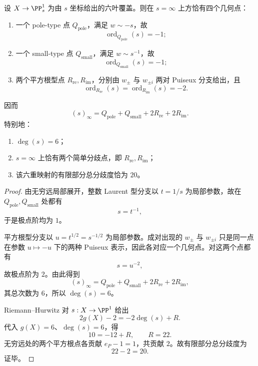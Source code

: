 \begin{theorem}\label{thm:conclusion-sprojection-infinity-pole-splitting-ramification20}
设 \(X\to \PP^1_s\) 为由 \(s\) 坐标给出的六叶覆盖。则在 \(s=\infty\) 上方恰有四个几何点：
\begin{enumerate}
  \item 一个 pole-type 点 \(Q_{\mathrm{pole}}\)，满足 \(w\sim -s\)，故
  \[
  \operatorname{ord}_{Q_{\mathrm{pole}}}(s)=-1;
  \]
  \item 一个 small-type 点 \(Q_{\mathrm{small}}\)，满足 \(w\sim s^{-1}\)，故
  \[
  \operatorname{ord}_{Q_{\mathrm{small}}}(s)=-1;
  \]
  \item 两个平方根型点 \(R_{\mathrm{re}},R_{\mathrm{im}}\)，分别由 \(w_\pm\) 与 \(w_{\pm i}\) 两对 Puiseux 分支给出，且
  \[
  \operatorname{ord}_{R_{\mathrm{re}}}(s)=\operatorname{ord}_{R_{\mathrm{im}}}(s)=-2.
  \]
\end{enumerate}
因而
\[
(s)_\infty=Q_{\mathrm{pole}}+Q_{\mathrm{small}}+2R_{\mathrm{re}}+2R_{\mathrm{im}}.
\]
特别地：
\begin{enumerate}
  \item \(\deg(s)=6\)；
  \item \(s=\infty\) 上恰有两个简单分歧点，即 \(R_{\mathrm{re}},R_{\mathrm{im}}\)；
  \item 该六重映射的有限部分总分歧度恰为 \(20\)。
\end{enumerate}
\end{theorem}
\begin{proof}
由无穷远局部展开，整数 Laurent 型分支以 \(t=1/s\) 为局部参数，故在 \(Q_{\mathrm{pole}},Q_{\mathrm{small}}\) 处都有
\[
s=t^{-1},
\]
于是极点阶均为 \(1\)。

平方根型分支以 \(u=t^{1/2}=s^{-1/2}\) 为局部参数。成对出现的 \(w_\pm\) 与 \(w_{\pm i}\) 只是同一点在参数 \(u\mapsto -u\) 下的两种 Puiseux 表示，因此各对应一个几何点。对这两个点都有
\[
s=u^{-2},
\]
故极点阶为 \(2\)。由此得到
\[
(s)_\infty=Q_{\mathrm{pole}}+Q_{\mathrm{small}}+2R_{\mathrm{re}}+2R_{\mathrm{im}},
\]
其总次数为 \(6\)，所以 \(\deg(s)=6\)。

Riemann--Hurwitz 对 \(s:X\to \PP^1\) 给出
\[
2g(X)-2=-2\deg(s)+R.
\]
代入 \(g(X)=6\)、\(\deg(s)=6\)，得
\[
10=-12+R,
\qquad
R=22.
\]
无穷远处的两个平方根点各贡献 \(e_P-1=1\)，共贡献 \(2\)。故有限部分总分歧度为
\[
22-2=20.
\]
证毕。
\end{proof}

